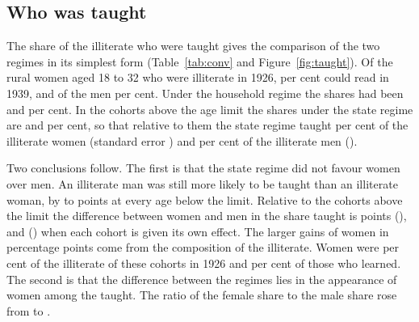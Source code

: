 \subsection{Who was taught}\label{sec:taught}

The share of the illiterate who were taught gives the comparison of the two regimes in its simplest form (Table~\ref{tab:conv} and Figure~\ref{fig:taught}). Of the rural women aged 18 to 32 who were illiterate in 1926,  per cent could read in 1939, and of the men  per cent. Under the household regime the shares had been  and  per cent. In the cohorts above the age limit the shares under the state regime are  and  per cent, so that relative to them the state regime taught  per cent of the illiterate women (standard error ) and  per cent of the illiterate men ().

\begin{table}[htbp]\centering
\caption{The illiterate who became literate, by regime, cohort and sex, rural population}\label{tab:conv}
\begingroup\small
\fitwidth{}
\endgroup
\end{table}

Two conclusions follow. The first is that the state regime did not favour women over men. An illiterate man was still more likely to be taught than an illiterate woman, by  to  points at every age below the limit. Relative to the cohorts above the limit the difference between women and men in the share taught is  points (), and  () when each cohort is given its own effect. The larger gains of women in percentage points come from the composition of the illiterate. Women were  per cent of the illiterate of these cohorts in 1926 and  per cent of those who learned. The second is that the difference between the regimes lies in the appearance of women among the taught. The ratio of the female share to the male share rose from  to .

